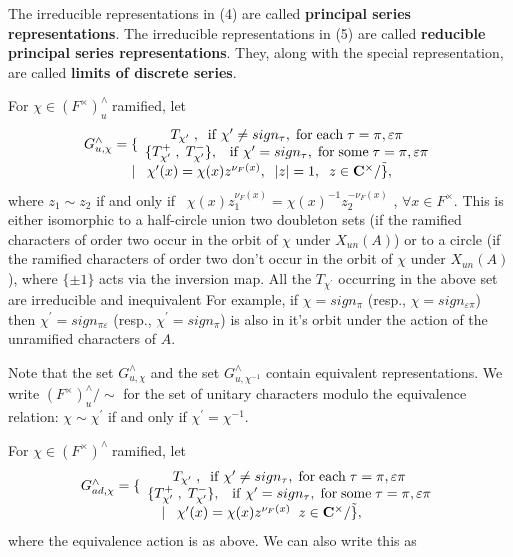 The irreducible representations in (4) are called {\bf principal series
representations}. The irreducible representations in (5) are called {\bf %
reducible principal series representations}. They, along with the special
representation, are called {\bf limits of discrete series}.

For $\chi \in (F^{\times })_u^{\wedge }\;$ramified, let 
\[
\begin{array}{c}
G_{u,\chi }^{\wedge }=\{ 
\begin{array}{c}
T_{\chi ^{\prime }}\;,\; {\rm \;if\;}\chi ^{\prime }\neq sign_\tau ,\;{\rm %
for\;each}\;\tau =\pi ,\varepsilon \pi \\ 
\{T_{\chi ^{\prime }}^{+}\;,\;T_{\chi ^{\prime }}^{-}\},\;\;{\rm \;if\;}\chi
^{\prime }=sign_\tau ,\;{\rm for\;some}\;\tau =\pi ,\varepsilon \pi
\end{array}
\\ 
\;|\;\;\;\chi ^{\prime }(x)=\chi (x)z^{\nu _F(x)},\;\;|z|=1,\;\;z\in {\bf C}%
^{\times }/\tilde\},
\end{array}
\]
where $z_1\sim z_2$ if and only if \ $\chi (x)z_1^{\nu _F(x)}=\chi
(x)^{-1}z_2^{-\nu _F(x)}$ , $\forall x\in F^{\times }.$ This is either
isomorphic to a half-circle union two doubleton sets (if the ramified
characters of order two occur in the orbit of $\chi $ under $X_{un}(A)$) or
to a circle (if the ramified characters of order two don't occur in the
orbit of $\chi $ under $X_{un}(A)$), where $\{\pm 1\}$ acts via the
inversion map. All the $T_{\chi ^{\prime }}$ occurring in the above set are
irreducible and inequivalent For example, if $\chi =sign_\pi $ (resp., $\chi
=sign_{\varepsilon \pi }$) then $\chi ^{\prime }=sign_{\pi \varepsilon }$
(resp., $\chi ^{\prime }=sign_\pi $) is also in it's orbit under the action
of the unramified characters of $A.$

Note that the set $G_{u,\chi }^{\wedge }$ and the set $G_{u,\chi
^{-1}}^{\wedge }$ contain equivalent representations. We write $(F^{\times
})_u^{\wedge }/\sim$ for the set of unitary characters modulo the
equivalence relation: $\chi \sim \chi ^{\prime }$ if and only if $\chi
^{\prime }=\chi ^{-1}$.

For $\chi \in (F^{\times })^{\wedge }\;$ramified, let 
\[
\begin{array}{c}
G_{ad,\chi }^{\wedge }=\{ 
\begin{array}{c}
T_{\chi ^{\prime }}\;,\; {\rm \;if\;}\chi ^{\prime }\neq sign_\tau ,\;{\rm %
for\;each}\;\tau =\pi ,\varepsilon \pi \\ 
\{T_{\chi ^{\prime }}^{+}\;,\;T_{\chi ^{\prime }}^{-}\},\;\;{\rm \;if\;}\chi
^{\prime }=sign_\tau ,\;{\rm for\;some}\;\tau =\pi ,\varepsilon \pi
\end{array}
\\ 
\;|\;\;\;\chi ^{\prime }(x)=\chi (x)z^{\nu _F(x)}\;\;z\in {\bf C}^{\times }/%
\tilde\},
\end{array}
\]
where the equivalence action is as above. We can also write this as


